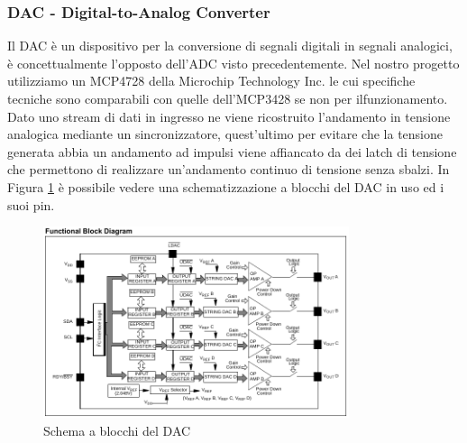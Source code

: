 \documentclass[10pt]{article}
\begin{document}
		\subsubsection{DAC - Digital-to-Analog Converter}\label{sec:dac}
		Il DAC è un dispositivo per la conversione di segnali digitali in segnali analogici, è concettualmente l'opposto dell'ADC visto precedentemente.
		Nel nostro progetto utilizziamo un MCP4728 della Microchip Technology Inc. le cui specifiche tecniche sono comparabili con quelle dell'MCP3428 se non per ilfunzionamento. Dato uno stream di dati in ingresso ne viene ricostruito l'andamento in tensione analogica  mediante un sincronizzatore, quest'ultimo per evitare che la tensione generata abbia un andamento ad impulsi viene affiancato da dei latch di tensione che permettono di realizzare un'andamento continuo di tensione senza sbalzi.
		In Figura \ref{fig:dac} è possibile vedere una schematizzazione a blocchi del DAC in uso ed i suoi pin.
		\begin{figure}[h]
			\centering
			\includegraphics[width=0.8\textwidth]{src/dac_block}
			\caption{Schema a blocchi del DAC}\label{fig:dac}
		\end{figure}
\end{document}
